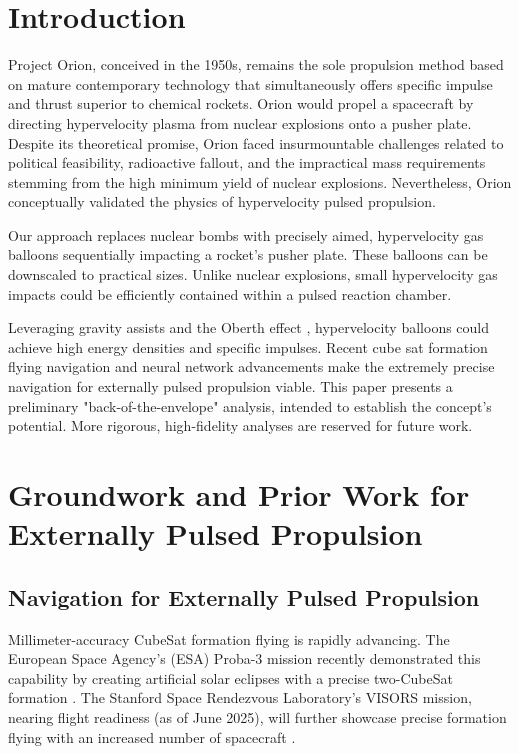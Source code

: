 \documentclass{article}
\begin{document}
\section{Introduction}
Project Orion, conceived in the 1950s, remains the sole propulsion method based on mature contemporary technology that simultaneously offers specific impulse and thrust superior to chemical rockets\cite{projorion}. Orion would propel a spacecraft by directing hypervelocity plasma from nuclear explosions onto a pusher plate. Despite its theoretical promise, Orion faced insurmountable challenges related to political feasibility, radioactive fallout, and the impractical mass requirements stemming from the high minimum yield of nuclear explosions. Nevertheless, Orion conceptually validated the physics of hypervelocity pulsed propulsion.

Our approach replaces nuclear bombs with precisely aimed, hypervelocity gas balloons sequentially impacting a rocket's pusher plate. These balloons can be downscaled to practical sizes.  Unlike nuclear explosions, small hypervelocity gas impacts could be efficiently contained within a pulsed reaction chamber.

Leveraging gravity assists and the Oberth effect \cite{oberth_effect}, hypervelocity balloons could achieve high energy densities and specific impulses.  Recent cube sat formation flying navigation and neural network advancements make the extremely precise navigation for externally pulsed propulsion viable.  This paper presents a preliminary "back-of-the-envelope" analysis, intended to establish the concept's potential. More rigorous, high-fidelity analyses are reserved for future work.

\section{Groundwork and Prior Work for Externally Pulsed Propulsion}
\subsection{Navigation for Externally Pulsed Propulsion}
Millimeter-accuracy CubeSat formation flying is rapidly advancing. The European Space Agency's (ESA) Proba-3 mission recently demonstrated this capability by creating artificial solar eclipses with a precise two-CubeSat formation \cite{esa_proba_3}. The Stanford Space Rendezvous Laboratory's VISORS mission, nearing flight readiness (as of June 2025), will further showcase precise formation flying with an increased number of spacecraft \cite{guffanti2023autonomous}.  
\end{document}

